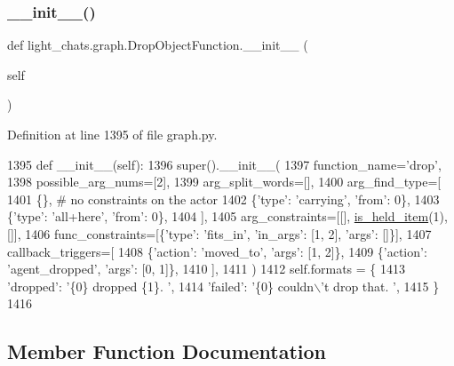 \subsubsection{\texorpdfstring{\+\_\+\+\_\+init\+\_\+\+\_\+()}{\_\_init\_\_()}}
{\footnotesize\ttfamily def light\+\_\+chats.\+graph.\+Drop\+Object\+Function.\+\_\+\+\_\+init\+\_\+\+\_\+ (\begin{DoxyParamCaption}\item[{}]{self }\end{DoxyParamCaption})}



Definition at line 1395 of file graph.\+py.


\begin{DoxyCode}
1395     \textcolor{keyword}{def }\_\_init\_\_(self):
1396         super().\_\_init\_\_(
1397             function\_name=\textcolor{stringliteral}{'drop'},
1398             possible\_arg\_nums=[2],
1399             arg\_split\_words=[],
1400             arg\_find\_type=[
1401                 \{\},  \textcolor{comment}{# no constraints on the actor}
1402                 \{\textcolor{stringliteral}{'type'}: \textcolor{stringliteral}{'carrying'}, \textcolor{stringliteral}{'from'}: 0\},
1403                 \{\textcolor{stringliteral}{'type'}: \textcolor{stringliteral}{'all+here'}, \textcolor{stringliteral}{'from'}: 0\},
1404             ],
1405             arg\_constraints=[[], \hyperlink{namespacelight__chats_1_1graph_aa0be6ee7e9f549a7195bea9dfb962ad6}{is\_held\_item}(1), []],
1406             func\_constraints=[\{\textcolor{stringliteral}{'type'}: \textcolor{stringliteral}{'fits\_in'}, \textcolor{stringliteral}{'in\_args'}: [1, 2], \textcolor{stringliteral}{'args'}: []\}],
1407             callback\_triggers=[
1408                 \{\textcolor{stringliteral}{'action'}: \textcolor{stringliteral}{'moved\_to'}, \textcolor{stringliteral}{'args'}: [1, 2]\},
1409                 \{\textcolor{stringliteral}{'action'}: \textcolor{stringliteral}{'agent\_dropped'}, \textcolor{stringliteral}{'args'}: [0, 1]\},
1410             ],
1411         )
1412         self.formats = \{
1413             \textcolor{stringliteral}{'dropped'}: \textcolor{stringliteral}{'\{0\} dropped \{1\}. '},
1414             \textcolor{stringliteral}{'failed'}: \textcolor{stringliteral}{'\{0\} couldn\(\backslash\)'t drop that. '},
1415         \}
1416 
\end{DoxyCode}


\subsection{Member Function Documentation}
\mbox{\label{classlight__chats_1_1graph_1_1DropObjectFunction_a2df3dbdd3032d47143978e645d12e928}} 
